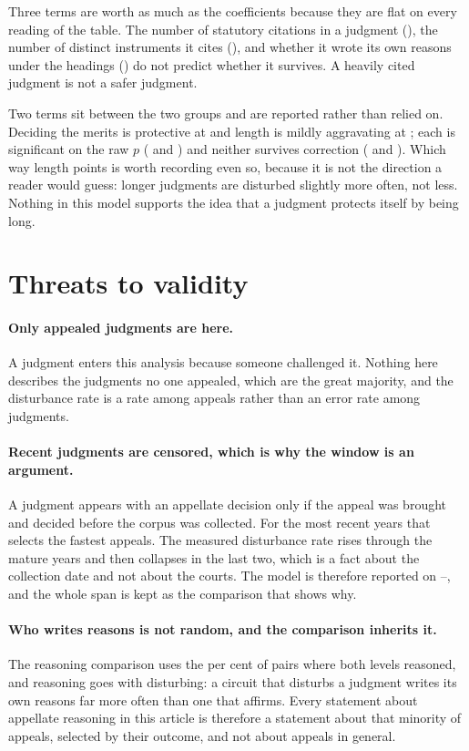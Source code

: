\documentclass[11pt]{article}
\begin{document}
Three terms are worth as much as the coefficients because they are flat on
every reading of the table. The number of statutory citations in a judgment
(\nOrCitations{}), the number of distinct instruments it cites
(\nOrInstruments{}), and whether it wrote its own reasons under the headings
(\nOrReasons{}) do not predict whether it survives. A heavily cited judgment
is not a safer judgment.

Two terms sit between the two groups and are reported rather than relied on.
Deciding the merits is protective at \nOrMerits{} and length is mildly
aggravating at \nOrLength{}; each is significant on the raw $p$
(\nPMerits{} and \nPLength{}) and neither survives correction
(\nHolmMerits{} and \nHolmLength{}). Which way length points is worth
recording even so, because it is not the direction a reader would guess:
longer judgments are disturbed slightly more often, not less. Nothing in this
model supports the idea that a judgment protects itself by being long.

\section{Threats to validity}
\label{sec:threats}

\paragraph{Only appealed judgments are here.} A judgment enters this analysis
because someone challenged it. Nothing here describes the judgments no one
appealed, which are the great majority, and the disturbance rate is a rate
among appeals rather than an error rate among judgments.

\paragraph{Recent judgments are censored, which is why the window is an
argument.} A judgment appears with an appellate decision only if the appeal
was brought and decided before the corpus was collected. For the most recent
years that selects the fastest appeals. The measured disturbance rate rises
through the mature years and then collapses in the last two, which is a fact
about the collection date and not about the courts. The model is therefore
reported on \nWindowFrom{}--\nWindowTo{}, and the whole span is kept as the
comparison that shows why.

\paragraph{Who writes reasons is not random, and the comparison inherits it.}
The reasoning comparison uses the \nBothReasonedShare{} per cent of pairs
where both levels reasoned, and reasoning goes with disturbing: a circuit that
disturbs a judgment writes its own reasons far more often than one that
affirms. Every statement about appellate reasoning in this article is
therefore a statement about that minority of appeals, selected by their
outcome, and not about appeals in general.
\end{document}
